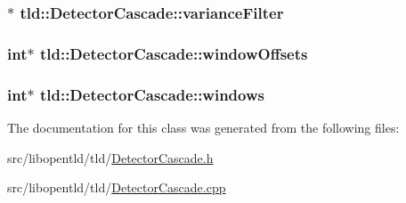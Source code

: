 \label{classtld_1_1_detector_cascade_a2549b35ac099860f20a13ef830081bbb}
\hypertarget{classtld_1_1_detector_cascade_a5d2600fc22f6cc39ef1940457324c5eb}{
\subsubsection[{varianceFilter}]{$\ast$ {\bf tld::DetectorCascade::varianceFilter}}}
\label{classtld_1_1_detector_cascade_a5d2600fc22f6cc39ef1940457324c5eb}
\hypertarget{classtld_1_1_detector_cascade_a259b095591f3d09904277ff844d94b0b}{
\subsubsection[{windowOffsets}]{\setlength{\rightskip}{0pt plus 5cm}int$\ast$ {\bf tld::DetectorCascade::windowOffsets}}}
\label{classtld_1_1_detector_cascade_a259b095591f3d09904277ff844d94b0b}
\hypertarget{classtld_1_1_detector_cascade_a0acc3bf212228a7b3d47b2d795f1a5a4}{
\subsubsection[{windows}]{\setlength{\rightskip}{0pt plus 5cm}int$\ast$ {\bf tld::DetectorCascade::windows}}}
\label{classtld_1_1_detector_cascade_a0acc3bf212228a7b3d47b2d795f1a5a4}


The documentation for this class was generated from the following files:\begin{DoxyCompactItemize}
\item 
src/libopentld/tld/\hyperlink{_detector_cascade_8h}{DetectorCascade.h}\item 
src/libopentld/tld/\hyperlink{_detector_cascade_8cpp}{DetectorCascade.cpp}\end{DoxyCompactItemize}
